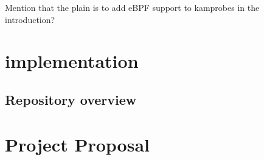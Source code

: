 \documentclass[12pt,twoside,notitlepage]{report}
\begin{document}
		Mention that the plain is to add eBPF support to kamprobes in the introduction?


\chapter{implementation}

    \section{Repository overview}

\printbibliography

\chapter*{Project Proposal}

%
\end{document}
